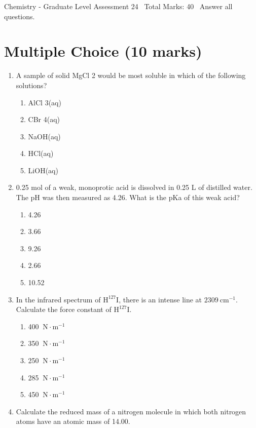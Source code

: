 \documentclass[12pt]{article}
\begin{document}
\begin{center}
Chemistry - Graduate Level Assessment 24 \
Total Marks: 40 \
Answer all questions.
\end{center}

\section*{Multiple Choice (10 marks)}
\begin{enumerate}[label=\arabic*.]
\item A sample of solid MgCl 2 would be most soluble in which of the following solutions?
\begin{enumerate}[label=(\alph*)]
    \item AlCl 3(aq)
    \item CBr 4(aq)
    \item NaOH(aq)
    \item HCl(aq)
    \item LiOH(aq)
\end{enumerate}
\item 0.25 mol of a weak, monoprotic acid is dissolved in 0.25 L of distilled water. The pH was then measured as 4.26. What is the pKa of this weak acid?
\begin{enumerate}[label=(\alph*)]
    \item 4.26
    \item 3.66
    \item 9.26
    \item 2.66
    \item 10.52
\end{enumerate}
\item In the infrared spectrum of $\mathrm{H}^{127} \mathrm{I}$, there is an intense line at $2309 \mathrm{~cm}^{-1}$. Calculate the force constant of $\mathrm{H}^{127} \mathrm{I}$.
\begin{enumerate}[label=(\alph*)]
    \item 400 $ \mathrm{~N} \cdot \mathrm{m}^{-1}$
    \item 350 $ \mathrm{~N} \cdot \mathrm{m}^{-1}$
    \item 250 $ \mathrm{~N} \cdot \mathrm{m}^{-1}$
    \item 285 $\mathrm{~N} \cdot \mathrm{m}^{-1}$
    \item 450 $\mathrm{~N} \cdot \mathrm{m}^{-1}$
\end{enumerate}
\item Calculate the reduced mass of a nitrogen molecule in which both nitrogen atoms have an atomic mass of 14.00.

\end{enumerate}
\end{document}
